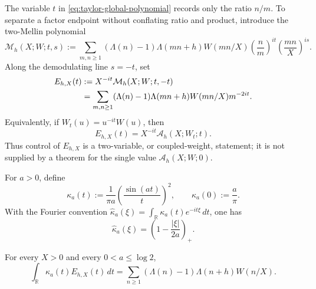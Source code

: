 The variable $t$ in \eqref{eq:taylor-global-polynomial} records only the
ratio $n/m$.  To separate a factor endpoint without conflating ratio and
product, introduce the two-Mellin polynomial
\begin{equation}
 \mathcal M_h(X;W;t,s)
 :=\sum_{m,n\geq1}(\Lambda(n)-1)\Lambda(mn+h)W(mn/X)
   \left(\frac{n}{m}\right)^{it}
   \left(\frac{mn}{X}\right)^{is}.
 \label{eq:selector-two-mellin-definition}
\end{equation}
Along the demodulating line $s=-t$, set
\begin{align}
 E_{h,X}(t)
 &:=X^{-it}\mathcal M_h(X;W;t,-t)
 \notag\\
 &=\sum_{m,n\geq1}(\Lambda(n)-1)\Lambda(mn+h)W(mn/X)m^{-2it}.
 \label{eq:selector-demodulated-polynomial}
\end{align}
Equivalently, if $W_t(u)=u^{-it}W(u)$, then
\begin{equation}
 E_{h,X}(t)=X^{-it}\mathcal A_h(X;W_t;t).
 \label{eq:selector-coupled-weight}
\end{equation}
Thus control of $E_{h,X}$ is a two-variable, or coupled-weight, statement;
it is not supplied by a theorem for the single value
$\mathcal A_h(X;W;0)$.

For $a>0$, define
\begin{equation}
 \kappa_a(t)
 :=\frac1{\pi a}\left(\frac{\sin(at)}{t}\right)^2,
 \qquad \kappa_a(0):=\frac a\pi.
 \label{eq:selector-sinc-kernel}
\end{equation}
With the Fourier convention
$\widehat\kappa_a(\xi)=\int_{\mathbb R}\kappa_a(t)e^{-it\xi}\,dt$,
one has
\begin{equation}
 \widehat\kappa_a(\xi)
 =\left(1-\frac{|\xi|}{2a}\right)_+.
 \label{eq:selector-triangle-transform}
\end{equation}

\begin{proposition}
\label{prop:selector-exact-m-one}
For every $X>0$ and every $0<a\leq\log2$,
\begin{equation}
 \int_{\mathbb R}\kappa_a(t)E_{h,X}(t)\,dt
 =\sum_{n\geq1}(\Lambda(n)-1)\Lambda(n+h)W(n/X).
 \label{eq:selector-exact-m-one}
\end{equation}
\end{proposition}

